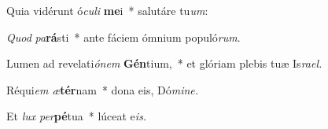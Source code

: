 \item Quia vidérunt ó\textit{culi} \textbf{me}i~* salutáre tu\textit{um}:
\item \textit{Quod} \textit{pa}\textbf{rá}sti~* ante fáciem ómnium populó\textit{rum}.
\item Lumen ad revelati\textit{ónem} \textbf{Gén}tium,~* et glóriam plebis tuæ Is\textit{rael.}
\item Réqui\tinyhspace\textit{em} \textit{æ}\textbf{tér}nam~* dona eis, Dó\textit{mine.}
\item Et \textit{lux} \textit{per}\textbf{pé}tua~* lúceat e\tinyhspace\textit{is.}
